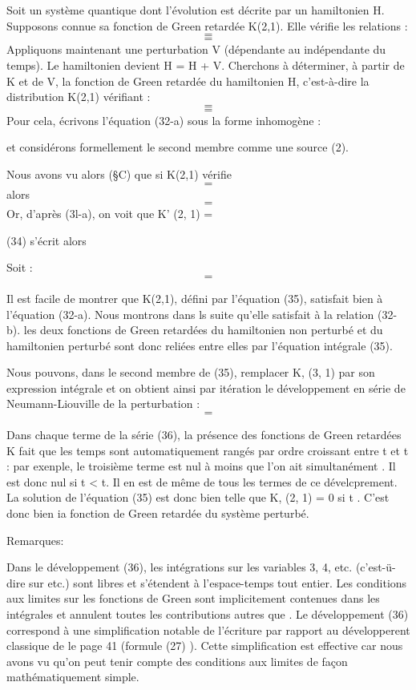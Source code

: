 \section{}%

Soit un système quantique dont l'évolution est décrite par un
hamiltonien H. Supposons connue sa fonction de Green retardée K(2,1).
Elle vérifie les relations :
\[
\tag{31-a}=
\]
\[
\tag{31-b}=
\]
Appliquons maintenant une perturbation V (dépendante au indépendante du
temps). Le hamiltonien devient H = H + V. Cherchons à déterminer, à partir
de K et de V, la fonction de Green retardée du hamiltonien H, c'est-à-dire
la distribution K(2,1) vérifiant :
\[
\tag{32-a}=
\]
\[
\tag{32-b}=
\]
Pour cela, écrivons l'équation (32-a) sous la forme inhomogène :

et considérons formellement le second membre comme une source  (2).


Nous avons vu alors (\S C) que si K(2,1) vérifie
\[
\tag{33}=
\]
alors
\[
\tag{34}=
\]
Or, d'après (3l-a), on voit que K' (2, 1) =

(34) s'écrit alors

Soit :
\[
\tag{35}=
\]

Il est facile de montrer que K(2,1), défini par l'équation (35),
satisfait bien à l'équation (32-a). Nous montrons dans ls suite qu'elle
satisfait à la relation (32-b). les deux fonctions de Green retardées
du hamiltonien non perturbé et du hamiltonien perturbé sont donc reliées
entre elles par l'équation intégrale (35).

Nous pouvons, dans le second membre de (35), remplacer K, (3, 1)
par son expression intégrale et on obtient ainsi par itération le développement
en série de Neumann-Liouville de la perturbation :
\[
\tag{36}=
\]

Dans chaque terme de la série (36), la présence des fonctions de
Green retardées K fait que les temps sont automatiquement rangés par
ordre croissant entre t et t : par exenple, le troisième terme est nul
à moins que l'on ait simultanément . Il est donc
nul si t < t. Il en est de même de tous les termes de ce dévelcprement.
La solution de l'équation (35) est donc bien telle que K, (2, 1) = 0 si
t . C'est donc bien ia fonction de Green retardée du système perturbé.

Remarques:

Dans le développement (36), les intégrations sur les variables 3, 4, etc.
(c'est-ü-dire sur etc.) sont libres et s'étendent à l'espace-temps tout entier.
Les conditions aux limites sur les fonctions de Green
sont implicitement contenues dans les intégrales et annulent toutes les contributions
autres que . Le développement (36) correspond
à une simplification notable de l'écriture par rapport au développerent
classique de le page 41 (formule (27) ). Cette simplification est effective
car nous avons vu qu'on peut tenir compte des conditions aux limites de façon
mathématiquement simple.
